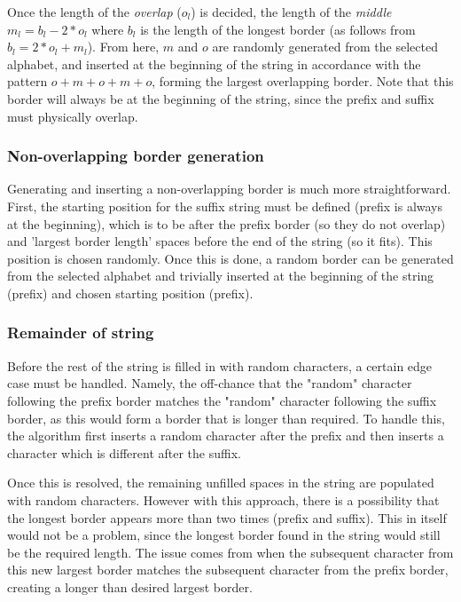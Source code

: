 \documentclass{l4proj}
\begin{document}
Once the length of the \emph{overlap} ($o_l$) is decided, the length of the \emph{middle} $m_l = b_l - 2 * o_l$ where $b_l$ is the length of the longest border (as follows from $b_l = 2 * o_l + m_l$). From here, $m$ and $o$ are randomly generated from the selected alphabet, and inserted at the beginning of the string in accordance with the pattern $o+m+o+m+o$, forming the largest overlapping border. Note that this border will always be at the beginning of the string, since the prefix and suffix must physically overlap.

\subsubsection{Non-overlapping border generation}

Generating and inserting a non-overlapping border is much more straightforward. First, the starting position for the suffix string must be defined (prefix is always at the beginning), which is to be after the prefix border (so they do not overlap) and 'largest border length' spaces before the end of the string (so it fits). This position is chosen randomly. Once this is done, a random border can be generated from the selected alphabet and trivially inserted at the beginning of the string (prefix) and chosen starting position (prefix). 

\subsubsection{Remainder of string}

Before the rest of the string is filled in with random characters, a certain edge case must be handled. Namely, the off-chance that the "random" character following the prefix border matches the "random" character following the suffix border, as this would form a border that is longer than required. To handle this, the algorithm first inserts a random character after the prefix and then inserts a character which is different after the suffix.

Once this is resolved, the remaining unfilled spaces in the string are populated with random characters. However with this approach, there is a possibility that the longest border appears more than two times (prefix and suffix). This in itself would not be a problem, since the longest border found in the string would still be the required length. The issue comes from when the subsequent character from this new largest border matches the subsequent character from the prefix border, creating a longer than desired largest border.
\end{document}
